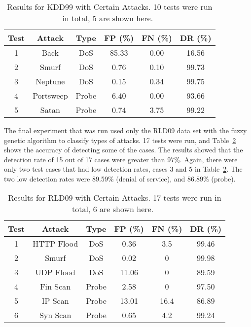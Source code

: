 \documentclass{sig-alternate}
\begin{document}
\begin{table}
\caption{Results for KDD99 with Certain Attacks. 10 tests were run in total, 5 are shown here.~\cite{6559603}}
\vspace{0.20cm}
\begin{tabular}{cccccc}
Test & Attack & Type & FP (\%) & FN (\%) & DR (\%)\\ \hline
1 & Back & DoS & 85.33 & 0.00 & 16.56\\
2 & Smurf & DoS & 0.76 & 0.10 & 99.73\\
3 & Neptune & DoS & 0.15 & 0.34 & 99.75\\
4 & Portsweep & Probe & 6.40 & 0.00 & 93.66\\
5 & Satan & Probe & 0.74 & 3.75 & 99.22\\
\end{tabular}
\label{tab:kddAttacks}
\end{table}

The final experiment that was run used only the RLD09 data set with the fuzzy genetic algorithm to classify types of attacks. 17 tests were run, and Table~\ref{tab:rldAttacks} shows the accuracy of detecting some of the cases. The results showed that the detection rate of 15 out of 17 cases were greater than 97\%. Again, there were only two test cases that had low detection rates, cases 3 and 5 in Table~\ref{tab:rldAttacks}. The two low detection rates were 89.59\% (denial of service), and 86.89\% (probe).

\begin{table}
\caption{Results for RLD09 with Certain Attacks. 17 tests were run in total, 6 are shown here.~\cite{6559603}}
\vspace{0.20cm}
\begin{tabular}{cccccc}
Test & Attack & Type & FP (\%) & FN (\%) & DR (\%)\\ \hline
1 & HTTP Flood & DoS & 0.36 & 3.5 & 99.46\\
2 & Smurf & DoS & 0.02 & 0 & 99.98\\
3 & UDP Flood & DoS & 11.06 & 0 & 89.59\\
4 & Fin Scan & Probe & 2.58 & 0 & 97.50\\
5 & IP Scan & Probe & 13.01 & 16.4 & 86.89\\
6 & Syn Scan & Probe & 0.65 & 4.2 & 99.24\\
\end{tabular}
\label{tab:rldAttacks}
\end{table}
\end{document}
